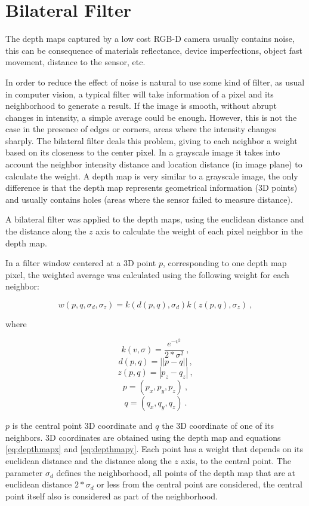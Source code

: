 \section{Bilateral Filter}


The depth maps captured by a low cost RGB-D camera usually contains noise, this can be 
consequence of materials reflectance, device imperfections, object fast movement, distance to the 
sensor, etc. 

In order to reduce the effect of noise is natural to use some kind of filter, as usual in computer 
vision, a typical filter will take information of a pixel and its neighborhood to generate a result. 
If the image is smooth, without abrupt changes in intensity, a simple average could be enough. However, this 
is not the case in the presence of edges or corners, areas where the intensity changes sharply. 
The bilateral filter deals this problem, giving to each neighbor a weight based on its closeness  
to the center pixel. In a grayscale image it takes into account 
the neighbor intensity distance and location distance (in image plane) to calculate the weight.  A depth map is very similar to a grayscale 
image, the only difference is that the depth map represents geometrical information (3D points) and usually contains holes 
(areas where the sensor failed to measure distance). 

A bilateral filter was applied to the depth maps, using the euclidean distance and the distance along the $z$ axis to calculate 
the weight of each pixel neighbor in the depth map. 

In a filter window centered at a 3D point $p$, corresponding to one depth map pixel, 
the weighted average was calculated using the following weight for each neighbor:


$$ w(p,q,\sigma_d,\sigma_z) = k(d(p,q),\sigma_d) k(z(p,q),\sigma_z)\ , $$

\noindent where 

$$ k(v,\sigma) = \frac{e^{-v^2}}{2*\sigma^2}\ , $$
$$ d(p,q) = ||p - q||\ , $$
$$ z(p,q) = |p_z - q_z|\ , $$
$$ p = (p_x,p_y,p_z)\ , $$ 
$$ q = (q_x,q_y,q_z)\ . $$

\noindent $p$ is the central point 3D coordinate and $q$ the 3D coordinate of one of its neighbors. 3D coordinates are obtained using
 the depth map and equations \ref{eq:depthmapx} and \ref{eq:depthmapy}.  Each point has a weight that depends on its euclidean distance and
 the distance along the $z$ axis, to the central point. The parameter $\sigma_d$ defines 
the neighborhood, all points of the depth map that are at euclidean distance $2*\sigma_d$ or less from the central point are considered, the 
central point itself also is considered as part of the neighborhood.


